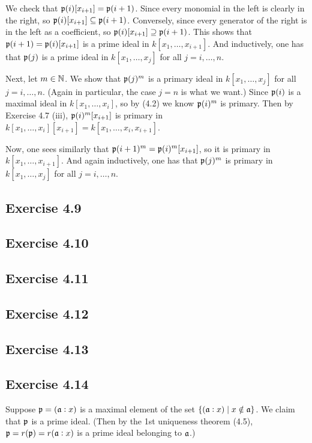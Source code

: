 \documentclass[../A&M.tex]{subfiles}
\begin{document}
We check that $\mathfrak{p}(i) [x_{i+1}] = \mathfrak{p}(i+1)$. Since every monomial in the left is clearly in the right, so $\mathfrak{p}(i) [x_{i+1}] \subseteq \mathfrak{p}(i+1)$. Conversely, since every generator of the right is in the left as a coefficient, so $\mathfrak{p}(i) [x_{i+1}] \supseteq \mathfrak{p}(i+1)$. This shows that $\mathfrak{p}(i+1) = \mathfrak{p}(i) [x_{i+1}]$ is a prime ideal in $k[x_1,\ldots,x_{i+1}]$. And inductively, one has that $\mathfrak{p}(j)$ is a prime ideal in $k[x_1,\ldots,x_j]$ for all $j=i,\ldots,n$.

Next, let $m\in\mathbb{N}$. We show that $\mathfrak{p}(j)^m$ is a primary ideal in $k[x_1,\ldots,x_j]$ for all $j=i,\ldots,n$. (Again in particular, the case $j=n$ is what we want.) Since $\mathfrak{p}(i)$ is a maximal ideal in $k[x_1,\ldots,x_i]$, so by (4.2) we know $\mathfrak{p}(i)^m$ is primary. Then by Exercise 4.7 (iii), $\mathfrak{p}(i)^m [x_{i+1}]$ is primary in $k[x_1,\ldots,x_i][x_{i+1}] = k[x_1,\ldots,x_i,x_{i+1}]$.

Now, one sees similarly that $\mathfrak{p}(i+1)^m = \mathfrak{p}(i)^m [x_{i+1}]$, so it is primary in $k[x_1,\ldots,x_{i+1}]$. And again inductively, one has that $\mathfrak{p}(j)^m$ is primary in $k[x_1,\ldots,x_j]$ for all $j=i,\ldots,n$.

\subsection*{Exercise 4.9}

\subsection*{Exercise 4.10}

\subsection*{Exercise 4.11}

\subsection*{Exercise 4.12}

\subsection*{Exercise 4.13}

\subsection*{Exercise 4.14}

Suppose $\mathfrak{p} = (\mathfrak{a}:x)$ is a maximal element of the set $\{ (\mathfrak{a}:x) \mid x \notin \mathfrak{a} \}$. We claim that $\mathfrak{p}$ is a prime ideal. (Then by the 1st uniqueness theorem (4.5), $\mathfrak{p} = r(\mathfrak{p}) = r(\mathfrak{a}:x)$ is a prime ideal belonging to $\mathfrak{a}$.)
\end{document}
